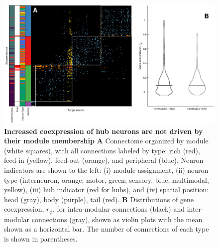 \documentclass[10pt,letterpaper]{article}
\begin{document}
\begin{figure}[!h]
\centering
    \includegraphics[width=1.2\textwidth]{Modules.eps}
 \caption{
 \textbf{Increased coexpression of hub neurons are not driven by their module membership}
\textbf{A} Connectome organized by module (white squares), with all connections labeled by type: rich (red), feed-in (yellow), feed-out (orange), and peripheral (blue).
Neuron indicators are shown to the left:
(i) module assignment,
(ii) neuron type (interneuron, orange; motor, green; sensory, blue; multimodal, yellow),
(iii) hub indicator (red for hubs), and
(iv) spatial position: head (gray), body (purple), tail (red).
\textbf{B} Distributions of gene coexpression, $r_\phi$, for intra-modular connections (black) and inter-modular connections (gray), shown as violin plots with the mean shown as a horizontal bar.
The number of connections of each type is shown in parentheses.
}
\end{figure}
\end{document}
